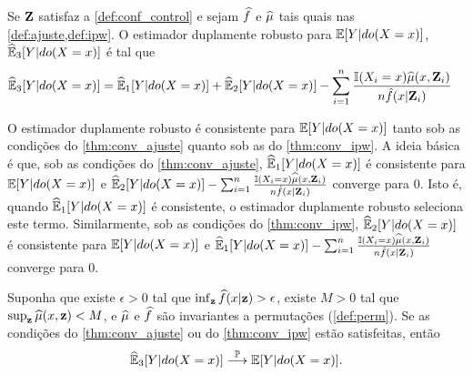 \begin{definition}
 Se ${\mathbf{Z}}$ satisfaz a \cref{def:conf_control} e 
 sejam $\widehat{f}$ e ${\widehat{\mu}}$ tais quais nas
 \cref{def:ajuste,def:ipw}.
 O estimador duplamente robusto para
 ${\mathbb E}[Y|do(X=x)]$, ${\widehat{{\mathbb E}}}_{3}[Y|do(X=x)]$ é tal que
 \label{def:duplo_robusto}
 \begin{align*}
  {\widehat{{\mathbb E}}}_{3}[Y|do(X=x)] 
  &= {\widehat{{\mathbb E}}}_{1}[Y|do(X=x)] + {\widehat{{\mathbb E}}}_{2}[Y|do(X=x)] 
  - \sum_{i=1}^n \frac{{\mathbb I}(X_i=x){\widehat{\mu}}(x,{\mathbf{Z}}_i)}{n\hat{f}(x|{\mathbf{Z}}_i)}
 \end{align*}
\end{definition}

O estimador duplamente robusto é consistente para
${\mathbb E}[Y|do(X=x)]$ tanto sob as condições do
\cref{thm:conv_ajuste} quanto sob as do
\cref{thm:conv_ipw}. A ideia básica é que,
sob as condições do \cref{thm:conv_ajuste},
${\widehat{{\mathbb E}}}_{1}[Y|do(X=x)]$ é consistente para ${\mathbb E}[Y|do(X=x)]$ e
${\widehat{{\mathbb E}}}_{2}[Y|do(X=x)] - \sum_{i=1}^n \frac{{\mathbb I}(X_i=x){\widehat{\mu}}(x,{\mathbf{Z}}_i)}{n\hat{f}(x|{\mathbf{Z}}_i)}$
converge para $0$. Isto é,
quando ${\widehat{{\mathbb E}}}_{1}[Y|do(X=x)]$ é consistente,
o estimador duplamente robusto seleciona este termo.
Similarmente, sob as condições do \cref{thm:conv_ipw},
${\widehat{{\mathbb E}}}_{2}[Y|do(X=x)]$ é consistente para ${\mathbb E}[Y|do(X=x)]$ e
${\widehat{{\mathbb E}}}_{1}[Y|do(X=x)] - \sum_{i=1}^n \frac{{\mathbb I}(X_i=x){\widehat{\mu}}(x,{\mathbf{Z}}_i)}{n\hat{f}(x|{\mathbf{Z}}_i)}$
converge para $0$.

\begin{theorem}
 \label{thm:conv_duplo_robusto}
 Suponha que existe $\epsilon > 0$ tal que
 $\inf_{\mathbf{z}} \widehat{f}(x|{\mathbf{z}}) > \epsilon$,
 existe $M > 0$ tal que 
 $\sup_{\mathbf{z}} {\widehat{\mu}}(x,{\mathbf{z}}) < M$, e
 ${\widehat{\mu}}$ e $\widehat{f}$ são invariantes 
 a permutações (\cref{def:perm}).
 Se as condições do \cref{thm:conv_ajuste} ou
 do \cref{thm:conv_ipw} estão satisfeitas, então
 \begin{align*}
  {\widehat{{\mathbb E}}}_{3}[Y|do(X=x)] \stackrel{{\mathbb P}}{\longrightarrow} {\mathbb E}[Y|do(X=x)].
 \end{align*}
\end{theorem}

